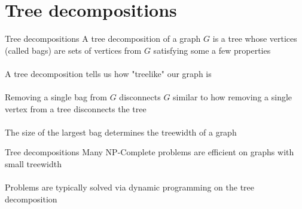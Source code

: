 \documentclass{beamer}
\begin{document}
\section{Tree decompositions}

\begin{frame}{Tree decompositions}
A tree decomposition of a graph $G$ is a tree whose vertices (called bags) are sets of vertices from $G$ satisfying some a few properties\\\\
A tree decomposition tells us how "treelike" our graph is\\\\
Removing a single bag from $G$ disconnects $G$ similar to how removing a single vertex from a tree disconnects the tree\\\\
The size of the largest bag determines the treewidth of a graph
\end{frame}

\begin{frame}{Tree decompositions}
Many \textsf{NP}-Complete problems are efficient on graphs with small treewidth\\\\
Problems are typically solved via dynamic programming on the tree decomposition
\end{frame}
\end{document}
